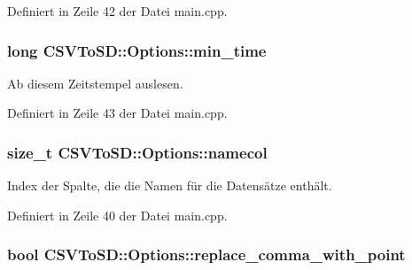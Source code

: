 Definiert in Zeile 42 der Datei main.\-cpp.

\hypertarget{structCSVToSD_1_1Options_a65261b994c8180995c6f95c44f863c20}{
\subsubsection[{min\-\_\-time}]{\setlength{\rightskip}{0pt plus 5cm}long C\-S\-V\-To\-S\-D\-::\-Options\-::min\-\_\-time}}\label{structCSVToSD_1_1Options_a65261b994c8180995c6f95c44f863c20}


Ab diesem Zeitstempel auslesen. 



Definiert in Zeile 43 der Datei main.\-cpp.

\hypertarget{structCSVToSD_1_1Options_a5195fcf1eced54268d6496c1640165af}{
\subsubsection[{namecol}]{\setlength{\rightskip}{0pt plus 5cm}size\-\_\-t C\-S\-V\-To\-S\-D\-::\-Options\-::namecol}}\label{structCSVToSD_1_1Options_a5195fcf1eced54268d6496c1640165af}


Index der Spalte, die die Namen für die Datensätze enthält. 



Definiert in Zeile 40 der Datei main.\-cpp.

\hypertarget{structCSVToSD_1_1Options_ab0204127a812664cc4bef7db1032ea99}{
\subsubsection[{replace\-\_\-comma\-\_\-with\-\_\-point}]{\setlength{\rightskip}{0pt plus 5cm}bool C\-S\-V\-To\-S\-D\-::\-Options\-::replace\-\_\-comma\-\_\-with\-\_\-point}}\label{structCSVToSD_1_1Options_ab0204127a812664cc4bef7db1032ea99}


